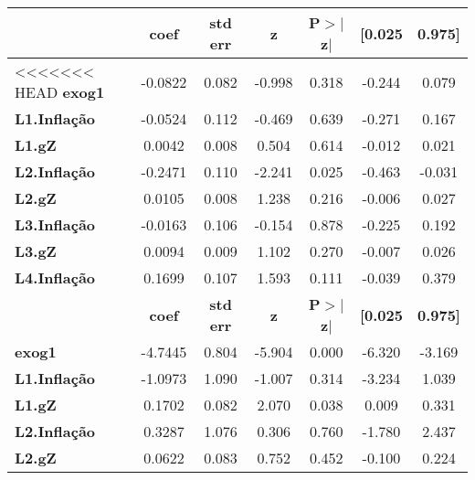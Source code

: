 \begin{center}
\begin{tabular}{lcccccc}
\toprule
                     & \textbf{coef} & \textbf{std err} & \textbf{z} & \textbf{P$> |$z$|$} & \textbf{[0.025} & \textbf{0.975]}  \\
\midrule
<<<<<<< HEAD
\textbf{exog1}       &      -0.0822  &        0.082     &    -0.998  &         0.318        &       -0.244    &        0.079     \\
\textbf{L1.Inflação} &      -0.0524  &        0.112     &    -0.469  &         0.639        &       -0.271    &        0.167     \\
\textbf{L1.gZ}       &       0.0042  &        0.008     &     0.504  &         0.614        &       -0.012    &        0.021     \\
\textbf{L2.Inflação} &      -0.2471  &        0.110     &    -2.241  &         0.025        &       -0.463    &       -0.031     \\
\textbf{L2.gZ}       &       0.0105  &        0.008     &     1.238  &         0.216        &       -0.006    &        0.027     \\
\textbf{L3.Inflação} &      -0.0163  &        0.106     &    -0.154  &         0.878        &       -0.225    &        0.192     \\
\textbf{L3.gZ}       &       0.0094  &        0.009     &     1.102  &         0.270        &       -0.007    &        0.026     \\
\textbf{L4.Inflação} &       0.1699  &        0.107     &     1.593  &         0.111        &       -0.039    &        0.379     \\
                     & \textbf{coef} & \textbf{std err} & \textbf{z} & \textbf{P$> |$z$|$} & \textbf{[0.025} & \textbf{0.975]}  \\
\midrule
\textbf{exog1}       &      -4.7445  &        0.804     &    -5.904  &         0.000        &       -6.320    &       -3.169     \\
\textbf{L1.Inflação} &      -1.0973  &        1.090     &    -1.007  &         0.314        &       -3.234    &        1.039     \\
\textbf{L1.gZ}       &       0.1702  &        0.082     &     2.070  &         0.038        &        0.009    &        0.331     \\
\textbf{L2.Inflação} &       0.3287  &        1.076     &     0.306  &         0.760        &       -1.780    &        2.437     \\
\textbf{L2.gZ}       &       0.0622  &        0.083     &     0.752  &         0.452        &       -0.100    &        0.224     \\

\end{tabular}
\end{center}
